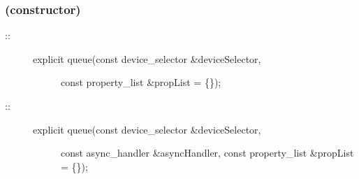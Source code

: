 \documentclass[letterpaper,10pt,english]{sphinxmanual}
\begin{document}
\subsubsection{(constructor)}
\label{\detokenize{programming-interface/runtime/queue:constructor}}
\begin{sphinxVerbatim}[commandchars=\\\{\}]
     
\end{sphinxVerbatim}

\begin{sphinxVerbatim}[commandchars=\\\{\}]
   
                   
\end{sphinxVerbatim}
\begin{description}
\item[{::}] \leavevmode\begin{description}
\item[{explicit queue(const device\_selector \&deviceSelector,}] \leavevmode
const property\_list \&propList = \{\});

\end{description}

\end{description}
\begin{description}
\item[{::}] \leavevmode\begin{description}
\item[{explicit queue(const device\_selector \&deviceSelector,}] \leavevmode
const async\_handler \&asyncHandler,
const property\_list \&propList = \{\});

\end{description}

\end{description}

\begin{sphinxVerbatim}[commandchars=\\\{\}]
        
\end{sphinxVerbatim}
\end{document}
